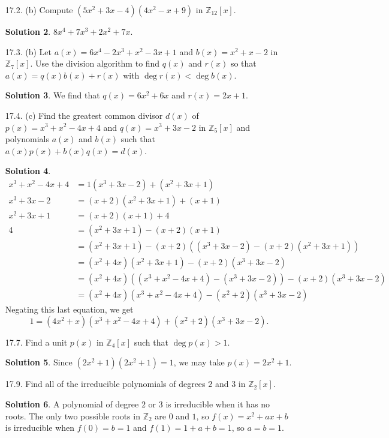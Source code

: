\documentclass{article}
\newcommand{\ZZ}{\mathbb{Z}}
\theoremstyle{definition}
\newtheorem*{solution}{Solution}
\begin{document}
\begin{enumerate}
\begin{enumerate}
\begin{solution}
\end{solution}
\end{enumerate}
\item[17.2. (b)] Compute $(5x^2 + 3x - 4)(4x^2 - x + 9)$ in $\ZZ_{12}[x]$.
\begin{solution}
$8x^4 + 7x^3 + 2x^2 + 7x$.
\end{solution}
\item[17.3. (b)] Let $a(x) = 6x^4 - 2x^3 + x^2 - 3x + 1$ and $b(x) = x^2 + x - 2$ in $\ZZ_7[x]$.  Use the division algorithm to find $q(x)$ and $r(x)$ so that $a(x) = q(x)b(x) + r(x)$ with $\deg r(x) < \deg b(x)$.
\begin{solution}
We find that $q(x) = 6x^2 + 6x$ and $r(x) = 2x+1$.
\end{solution}
\item[17.4. (c)] Find the greatest common divisor $d(x)$ of $p(x) = x^3 + x^2 - 4x + 4$ and $q(x) = x^3 + 3x - 2$ in $\ZZ_5[x]$ and polynomials $a(x)$ and $b(x)$ such that $a(x)p(x) + b(x)q(x) = d(x).$
\begin{solution}
\begin{align*}
x^3 + x^2 - 4x + 4 &= 1(x^3 + 3x - 2) + (x^2 + 3x + 1) \\
x^3 + 3x - 2 &= (x+2)(x^2 + 3x + 1) + (x+1) \\
x^2 + 3x + 1 &= (x+2)(x+1) + 4 \\
4 &= (x^2 + 3x + 1) - (x+2)(x+1) \\
&= (x^2 + 3x + 1) - (x+2)((x^3 +3x - 2) - (x+2)(x^2 + 3x+1)) \\
&= (x^2 + 4x)(x^2 + 3x + 1) - (x+2)(x^3 + 3x - 2) \\
&= (x^2 + 4x)((x^3 + x^2 -4x + 4) - (x^3 + 3x - 2)) - (x+2)(x^3 + 3x - 2) \\
&= (x^2 + 4x)(x^3 + x^2 -4x + 4) - (x^2 + 2)(x^3 + 3x - 2)
\end{align*}
Negating this last equation, we get
\[
1 = (4x^2 + x)(x^3 + x^2 -4x + 4) + (x^2 + 2)(x^3 + 3x - 2).
\]
\end{solution}
\item[17.7.] Find a unit $p(x)$ in $\ZZ_4[x]$ such that $\deg p(x) > 1$.
\begin{solution}
Since $(2x^2+1)(2x^2+1) = 1$, we may take $p(x) = 2x^2 + 1$.
\end{solution}
\item[17.9.] Find all of the irreducible polynomials of degrees $2$ and $3$ in $\ZZ_2[x]$.
\begin{solution}
A polynomial of degree $2$ or $3$ is irreducible when it has no roots.  The only two possible roots in $\ZZ_2$ are $0$ and $1$, so $f(x) = x^2 + ax + b$ is irreducible when $f(0) = b = 1$ and $f(1) = 1 + a + b = 1$, so $a = b =1$.


\end{solution}
\end{enumerate}
\end{document}
